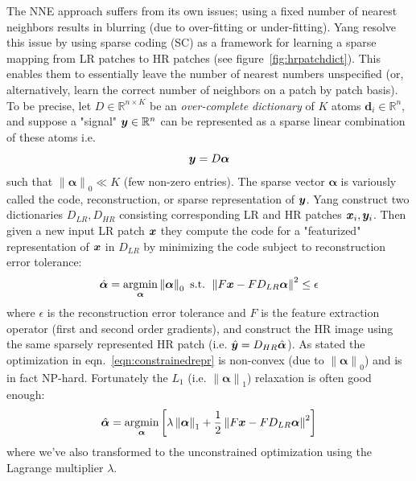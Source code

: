 The NNE approach suffers from its own issues; using a fixed number of nearest neighbors results in blurring (due to over-fitting or under-fitting).
%
Yang \etal\cite{yang2008} resolve this issue by using sparse coding (SC) as a framework for learning a sparse mapping from LR patches to HR patches (see figure~\ref{fig:hrpatchdict}).
%
This enables them to essentially leave the number of nearest numbers unspecified (or, alternatively, learn the correct number of neighbors on a patch by patch basis).
%
To be precise, let $D \in \mathbb{R}^{n \times K}$ be an \textit{over-complete dictionary} of $K$ atoms $\bm{d}_i \in \mathbb{R}^n$, and suppose a "signal" $\bm{y} \in \mathbb{R}^n$ can be represented as a sparse linear combination of these atoms i.e.
\begin{equation}
    \bm{y} = D\bm{\alpha}
\end{equation}
such that $\left\| \bm{\alpha} \right\|_0 \ll K$ (few non-zero entries).
%
The sparse vector $\bm{\alpha}$ is variously called the code, reconstruction, or sparse representation of $\bm{y}$.
%
Yang \etal construct two dictionaries $D_{LR}, D_{HR}$ consisting corresponding LR and HR patches $\bm{x}_i, \bm{y}_i$.
%
Then given a new input LR patch $\bm{x}$ they compute the code for a "featurized" representation of $\bm{x}$ in $D_{LR}$ by minimizing the code subject to reconstruction error tolerance:
\begin{equation}
    \hat{\bm{\alpha}} = \underset{\bm{\alpha}}{\text{argmin}} \left\| \bm{\alpha} \right\|_0 \text{ s.t. } \left\| F\bx - FD_{LR}\bm{\alpha} \right\|^2 \leq \epsilon
    \label{eqn:constrainedrepr}
\end{equation}
where $\epsilon$ is the reconstruction error tolerance and $F$ is the feature extraction operator (first and second order gradients), and construct the HR image using the same sparsely represented HR patch (i.e. $\hat{\bm{y}} = D_{HR} \hat{\bm{\alpha}}$).
%
As stated the optimization in eqn.~\ref{eqn:constrainedrepr} is non-convex (due to $\left\| \bm{\alpha} \right\|_0$) and is in fact NP-hard\cite{tilman2015}.
%
Fortunately the $L_1$ (i.e. $\left\| \bm{\alpha} \right\|_1$) relaxation is often good enough\cite{Donoho9446}:
\begin{equation}
    \hat{\bm{\alpha}} = \underset{\bm{\alpha}}{\text{argmin}} \left[ \lambda\left\| \bm{\alpha} \right\|_1 + \frac{1}{2}\left\| F\bx - FD_{LR}\bm{\alpha} \right\|^2 \right]
    \label{eqn:lagrangerepr}
\end{equation}
where we've also transformed to the unconstrained optimization using the Lagrange multiplier $\lambda$.
